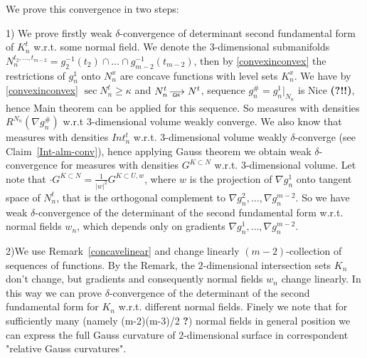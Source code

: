   We prove this convergence in two steps:  
  
 1) We prove firstly 
 weak $\delta$-convergence of
 determinant second  fundamental form of $K^t_n$ w.r.t. some 
 normal field.
 We denote the $3$-dimensional submanifolds
 $N^{t_2,\dots,t_{m-2}}_n=g_2^{-1}(t_2)\cap\dots\cap g_{m-2}^{-1}(t_{m-2})$, then
 by \ref{convexinconvex}  the restrictions of $g_n^1$ onto $N_n^x$ are concave   functions
 with level sets
 $K_n^x$. 
 We have by \ref{convexinconvex} 
  $\sec N^{t}_n\ge\kappa$ and
 $N_n^t\GHto N^t$, sequence $g^\#_n=g^1_n|_{N_n}$ is
 Nice {\bf (?!!)},   hence Main theorem can be applied for this sequence.
 So measures with densities  
 $R^{N_n}(\nabla g^\#_n)$ w.r.t $3$-dimensional volume
 weakly converge.
We also  know that measures with densities $Int^t_n$ w.r.t. 
$3$-dimensional volume
  weakly $\delta$-converge (see Claim~\ref{Int-alm-conv}), hence
   applying   Gauss theorem
    we obtain  weak $\delta$-convergence 
    for measures with densities $G^{K\subset N}$
    w.r.t.       $3$-dimensional volume.
    Let note that
    $\cdot G^{K\subset N}=\frac{1}{|w|^2}G^{K\subset U,w}$, where $w$
    is the projection of $\nabla g^1_n$ onto tangent  
    space of $N^t_n$, that is the orthogonal complement to
    $\nabla g^2_n,\dots,\nabla g^{m-2}_n$. 
    So we have weak $\delta$-convergence 
of         the determinant of the 
second fundamental form w.r.t. normal fields $w_n$, which depends only on
gradients $\nabla g^1_n,\dots,\nabla g^{m-2}_n$. 
       
  2)We use Remark~\ref{concavelinear}
and change  linearly  $(m-2)$-collection of sequences of functions.
 By the Remark, the
    $2$-dimensional intersection sets  $K_n$
    don't change, but gradients and consequently 
     normal fields $w_n$ change linearly.
   In this way  we can prove
    $\delta$-convergence 
of         the determinant of the 
second fundamental form for $K_n$ w.r.t.  different normal fields.     
 Finely we note that for sufficiently many (namely (m-2)(m-3)/2 {\bf?})
  normal fields in general position
  we can express the     
    full Gauss curvature of $2$-dimensional surface 
      in correspondent "relative Gauss curvatures".




